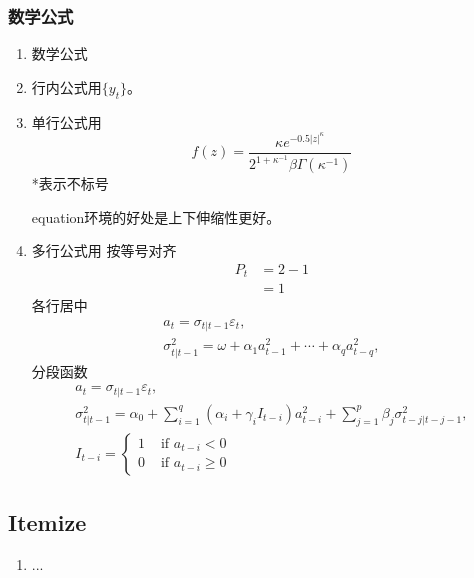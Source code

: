 		\subsubsection{数学公式}
			\begin{enumerate}
				\setlength{\itemsep}{0pt}
				\setlength{\parsep}{0pt}
				\setlength{\parskip}{0pt}

				\item 数学公式
					\item 行内公式用$\{y_{t}\}$。
					\item 单行公式用
						\begin{equation*}
							f(z)=\frac{\kappa e^{-0.5|z|^{\kappa}}}{2^{1+\kappa^{-1}} \beta \Gamma\left(\kappa^{-1}\right)}
						\end{equation*}
						*表示不标号

						equation环境的好处是上下伸缩性更好。
					\item 多行公式用
					\subitem 按等号对齐
						\begin{align*}
							P_{t}     &=  2-1\\
												&=  1
						\end{align*}
					\subitem 各行居中
						\begin{displaymath}
							\begin{array}{c}
								a_{t}=\sigma_{t | t-1} \varepsilon_{t}, \\
								\sigma_{t | t-1}^{2}=\omega+\alpha_{1} a_{t-1}^{2}+\cdots+\alpha_{q} a_{t-q}^{2},
							\end{array}
						\end{displaymath}
					\subitem 分段函数
						\begin{displaymath}
							\begin{array}{c}
								a_{t}=\sigma_{t | t-1} \varepsilon_{t}, \\
								\sigma_{t | t-1}^{2}=\alpha_{0}+\sum_{i=1}^{q}\left(\alpha_{i}+\gamma_{i} I_{t-i}\right) a_{t-i}^{2}+\sum_{j=1}^{p} \beta_{j} \sigma_{t-j | t-j-1}^{2},\\
								I_{t-i}=\left\{\begin{array}{ll}
								1 & \text { if } a_{t-i}<0 \\
								0 & \text { if } a_{t-i} \geq 0
								\end{array}\right.
							\end{array}
						\end{displaymath}
			\end{enumerate}

	\subsection{Itemize}
		\begin{enumerate}
			\setlength{\itemsep}{0pt}
			\setlength{\parsep}{0pt}
			\setlength{\parskip}{0pt}

			\item ...
		\end{enumerate}

